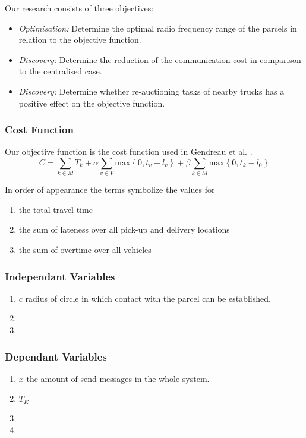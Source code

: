 \documentclass[../main.tex]{subfiles}
\begin{document}
Our research consists of three objectives:
\begin{itemize}
	\item \textit{Optimisation:} Determine the optimal radio frequency range of the parcels in relation to the objective function.
	\item \textit{Discovery:} Determine the reduction of the communication cost in comparison to the centralised case.
	\item \textit{Discovery:} Determine whether re-auctioning tasks of nearby trucks has a positive effect on the objective function. 
\end{itemize}

\subsubsection{Cost Function}
Our objective function is the cost function used in Gendreau et al. \cite{gendreau2006neighborhood}.
$$
C = \sum_{k \in M}{T_k} + \alpha \sum_{v \in V} \text{max} \left\{ 0, t_v - l_v \right\} + \beta \sum_{k \in M} \text{max} \left\{0, t_k - l_0 \right\} 
$$

In order of appearance the terms symbolize the values for
\begin{enumerate}
	\item the total travel time 
	\item the sum of lateness over all pick-up and delivery locations
	\item the sum of overtime over all vehicles
\end{enumerate}


\subsubsection{Independant Variables }
\begin{enumerate}
	\item $c$ radius of circle in which contact with the parcel can be established.
	\item 
	\item 
\end{enumerate}
\subsubsection{Dependant Variables}
\begin{enumerate}
	\item $x$ the amount of send messages in the whole system.  
	\item $T_K$
	\item 
	\item 
\end{enumerate}
\end{document}
